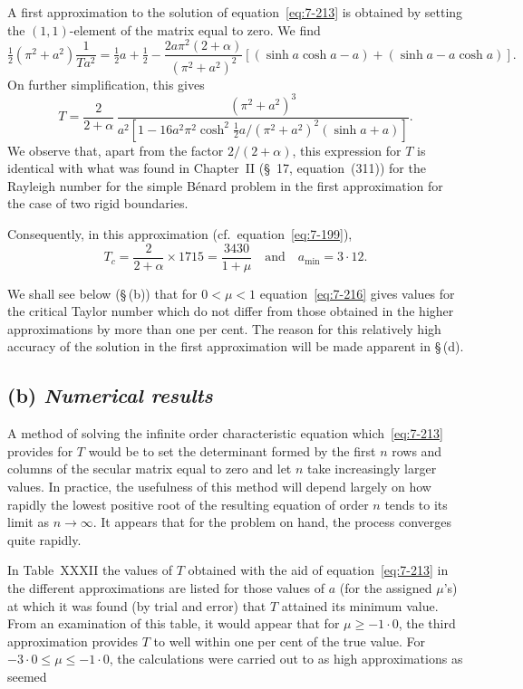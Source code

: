 A first approximation to the solution of equation~\eqref{eq:7-213} is obtained by
setting the $(1,1)$-element of the matrix equal to zero.  We find
\begin{equation}
\label{eq:7-214}
\tfrac{1}{2}(\pi^2+a^2)\frac{1}{Ta^2} = \tfrac{1}{2}a+\tfrac{1}{2} -
\frac{2a\pi^2(2+\alpha)}{(\pi^2+a^2)^2}
[(\sinh a\cosh a - a) + (\sinh a - a\cosh a)].
\end{equation}
On further simplification, this gives
\begin{equation}
\label{eq:7-215}
T = \frac{2}{2+\alpha}\,\frac{(\pi^2+a^2)^3}{a^2[1 -
16a^2\pi^2\cosh^2\!\frac{1}{2}a/(\pi^2+a^2)^2(\sinh a + a)]}.
\end{equation}
We observe that, apart from the factor $2/(2+\alpha)$, this expression for $T$
is identical with what was found in Chapter~II (\S~17, equation~(311)) for
the Rayleigh number for the simple B\'enard problem in the first
approximation for the case of two rigid boundaries.

Consequently, in this approximation (cf.\ equation~\eqref{eq:7-199}),
\begin{equation}
\label{eq:7-216}
T_c = \frac{2}{2+\alpha}\times 1715 = \frac{3430}{1+\mu}
\quad \text{and} \quad
a_{\min} = 3{\cdot}12.
\end{equation}

We shall see below (\S\,(b)) that for $0 < \mu < 1$ equation~\eqref{eq:7-216} gives
values for the critical Taylor number which do not differ from those
obtained in the higher approximations by more than one per cent.  The
reason for this relatively high accuracy of the solution in the first
approximation will be made apparent in \S\,(d).

\subsection*{(b) \emph{Numerical results}}
A method of solving the infinite order characteristic equation which~\eqref{eq:7-213} provides for $T$ would be to set the determinant formed by the first
$n$ rows and columns of the secular matrix equal to zero and let $n$ take
increasingly larger values.  In practice, the usefulness of this method will
depend largely on how rapidly the lowest positive root of the resulting
equation of order $n$ tends to its limit as $n \to \infty$.  It appears that for the
problem on hand, the process converges quite rapidly.

In Table~XXXII the values of $T$ obtained with the aid of equation~\eqref{eq:7-213} in the different approximations are listed for those values of $a$
(for the assigned $\mu$'s) at which it was found (by trial and error) that $T$
attained its minimum value.  From an examination of this table, it
would appear that for $\mu \geqslant -1{\cdot}0$, the third approximation provides $T$
to well within one per cent of the true value.  For $-3{\cdot}0 \leqslant \mu \leqslant -1{\cdot}0$,
the calculations were carried out to as high approximations as seemed

